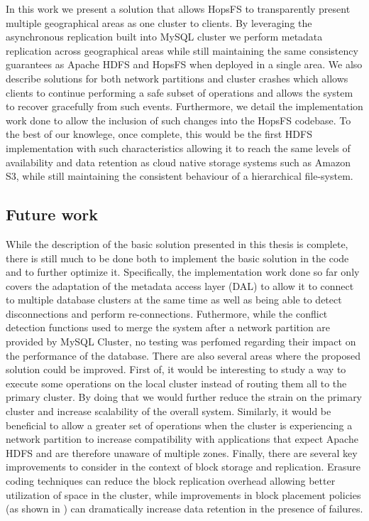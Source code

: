 In this work we present a solution that allows HopsFS to transparently present multiple geographical areas as one cluster to clients.
By leveraging the asynchronous replication built into MySQL cluster we perform metadata replication across geographical areas while still maintaining the same consistency guarantees as Apache HDFS and HopsFS when deployed in a single area.
We also describe solutions for both network partitions and cluster crashes which allows clients to continue performing a safe subset of operations and allows the system to recover gracefully from such events.
Furthermore, we detail the implementation work done to allow the inclusion of such changes into the HopsFS codebase.
To the best of our knowlege, once complete, this would be the first HDFS implementation with such characteristics allowing it to reach the same levels of availability and data retention as cloud native storage systems such as Amazon S3, while still maintaining the consistent behaviour of a hierarchical file-system.
\subsection{Future work}
While the description of the basic solution presented in this thesis is complete, there is still much to be done both to implement the basic solution in the code and to further optimize it.
Specifically, the implementation work done so far only covers the adaptation of the metadata access layer (DAL) to allow it to connect to multiple database clusters at the same time as well as being able to detect disconnections and perform re-connections.
Futhermore, while the conflict detection functions used to merge the system after a network partition are provided by MySQL Cluster, no testing was perfomed regarding their impact on the performance of the database.
There are also several areas where the proposed solution could be improved.
First of, it would be interesting to study a way to execute some operations on the local cluster instead of routing them all to the primary cluster.
By doing that we would further reduce the strain on the primary cluster and increase scalability of the overall system.
Similarly, it would be beneficial to allow a greater set of operations when the cluster is experiencing a network partition to increase compatibility with applications that expect Apache HDFS and are therefore unaware of multiple zones.
Finally, there are several key improvements to consider in the context of block storage and replication.
Erasure coding techniques \cite{DBLP:conf/usenix/HuangSXOCG0Y12,grohsschmiedt2014making} can reduce the block replication overhead allowing better utilization of space in the cluster, while improvements in block placement policies (as shown in \cite{DBLP:conf/usenix/CidonRSKOR13}) can dramatically increase data retention in the presence of failures.